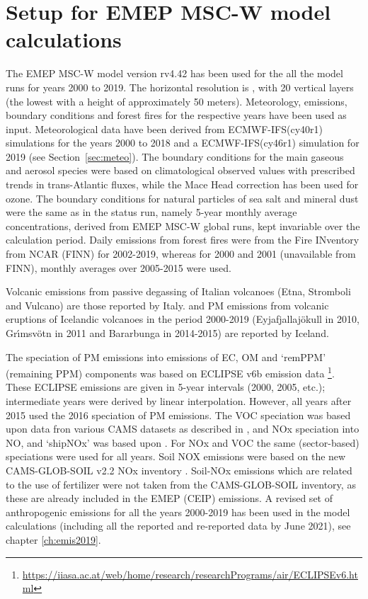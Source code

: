 
\section{\label{EMEPmodelcalc}{Setup for EMEP MSC-W model calculations}}
The EMEP MSC-W model version rv4.42 has been used for the all the model runs for years 2000 to 2019. The horizontal resolution is \resZO, with 20 vertical layers (the lowest with a height of approximately 50 meters).
 Meteorology, emissions, boundary conditions and forest fires for the respective years have been used as input. Meteorological data have been
 derived from ECMWF-IFS(cy40r1) simulations for the years 2000 to 2018 and a ECMWF-IFS(cy46r1) simulation for 2019 (see Section~\ref{sec:meteo}). 
 The boundary conditions for the main gaseous and aerosol species were based on climatological observed values with prescribed trends in trans-Atlantic fluxes, while the Mace
Head correction has been used for ozone. The boundary conditions for natural particles of
sea salt and mineral dust were the same as in the status run, namely 5-year monthly average
concentrations, derived from EMEP MSC-W global runs, kept invariable over the calculation
period.
Daily emissions from forest fires were from the Fire INventory from NCAR (FINN) for 2002-2019,
whereas for 2000 and 2001 (unavailable from FINN), monthly averages over 2005-2015 were
used.

Volcanic \sox emissions from passive degassing of Italian volcanoes (Etna,
Stromboli and Vulcano) are those reported by
Italy. \sox and PM emissions from volcanic eruptions of Icelandic volcanoes in the period 2000-2019 (Eyjafjallaj\"okull in 2010, Gr{\'{\i}}msv{\"{o}}tn in 2011  and  Bar\dh{}arbunga in 2014-2015) are reported by Iceland. 
 
The speciation of PM emissions into emissions of EC, OM and `remPPM' (remaining PPM) components was based on ECLIPSE v6b emission data \footnote{\url{https://iiasa.ac.at/web/home/research/researchPrograms/air/ECLIPSEv6.html}}. These ECLIPSE emissions are given in 5-year intervals (2000, 2005, etc.); intermediate years were derived by linear interpolation. However, all years after 2015 used the 2016 speciation of PM emissions. The VOC speciation was based upon data fron various CAMS datasets as described in \cite{R2020:ModDev}, and NOx speciation into NO,  and `shipNOx' was based upon . For NOx and VOC the same (sector-based) speciations were used for all years.
Soil NOX emissions were based on the new CAMS-GLOB-SOIL v2.2 NOx inventory \citet{SimpsonDarras:2021}. Soil-NOx emissions which are related to the use of fertilizer were not taken from the CAMS-GLOB-SOIL inventory, as these are already included in the EMEP (CEIP) emissions.
A revised set of anthropogenic emissions for all the years 2000-2019 has been used in the model calculations (including all the reported and re-reported data by June 2021), see chapter \ref{ch:emis2019}.

